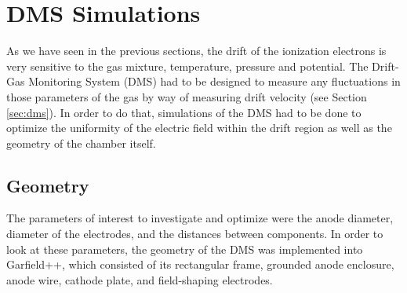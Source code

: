 \section{DMS Simulations}
As we have seen in the previous sections, the drift of the ionization electrons is very sensitive to the gas mixture, temperature, pressure and potential. The Drift-Gas Monitoring System (DMS) had to be designed to measure any fluctuations in those parameters of the gas by way of measuring drift velocity (see Section \ref{sec:dms}). In order to do that, simulations of the DMS had to be done to optimize the uniformity of the electric field within the drift region as well as the geometry of the chamber itself.
\subsection{Geometry}
The parameters of interest to investigate and optimize were the anode diameter, diameter of the electrodes, and the distances between components. In order to look at these parameters, the geometry of the DMS was implemented into Garfield++, which consisted of its rectangular frame, grounded anode enclosure, anode wire, cathode plate, and field-shaping electrodes. 

